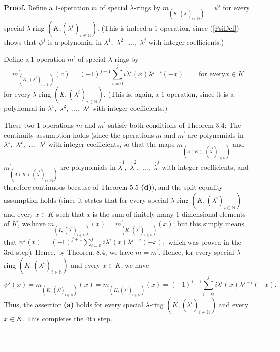 \documentclass[numbers=enddot,12pt,final,onecolumn,notitlepage]{scrartcl}%
\newenvironment{proof}[1][Proof]{\noindent\textbf{#1.} }{\ \rule{0.5em}{0.5em}}
\begin{document}
\begin{proof}
Define a $1$-operation $m$ of special $\lambda$-rings by $m_{\left(  K,\left(
\lambda^{i}\right)  _{i\in\mathbb{N}}\right)  }=\psi^{j}$ for every special
$\lambda$-ring $\left(  K,\left(  \lambda^{i}\right)  _{i\in\mathbb{N}%
}\right)  $. (This is indeed a $1$-operation, since (\ref{PsiDef}) shows that
$\psi^{j}$ is a polynomial in $\lambda^{1},$ $\lambda^{2},$ $...,$
$\lambda^{j}$ with integer coefficients.)

Define a $1$-operation $m^{\prime}$ of special $\lambda$-rings by%
\[
m_{\left(  K,\left(  \lambda^{i}\right)  _{i\in\mathbb{N}}\right)  }^{\prime
}\left(  x\right)  =\left(  -1\right)  ^{j+1}\sum_{i=0}^{j}i\lambda^{i}\left(
x\right)  \lambda^{j-i}\left(  -x\right)  \ \ \ \ \ \ \ \ \ \ \text{for every
}x\in K
\]
for every $\lambda$-ring $\left(  K,\left(  \lambda^{i}\right)  _{i\in
\mathbb{N}}\right)  $. (This is, again, a $1$-operation, since it is a
polynomial in $\lambda^{1},$ $\lambda^{2},$ $...,$ $\lambda^{j}$ with integer coefficients.)

These two $1$-operations $m$ and $m^{\prime}$ satisfy both conditions of
Theorem 8.4: The continuity assumption holds (since the operations $m$ and
$m^{\prime}$ are polynomials in $\lambda^{1},$ $\lambda^{2},$ $...,$
$\lambda^{j}$ with integer coefficients, so that the maps $m_{\left(
\Lambda\left(  K\right)  ,\left(  \widehat{\lambda}^{i}\right)  _{i\in
\mathbb{N}}\right)  }$ and $m_{\left(  \Lambda\left(  K\right)  ,\left(
\widehat{\lambda}^{i}\right)  _{i\in\mathbb{N}}\right)  }^{\prime}$ are
polynomials in $\widehat{\lambda}^{1},$ $\widehat{\lambda}^{2},$ $...,$
$\widehat{\lambda}^{j}$ with integer coefficients, and therefore continuous
because of Theorem 5.5 \textbf{(d)}), and the split equality assumption holds
(since it states that for every special $\lambda$-ring $\left(  K,\left(
\lambda^{i}\right)  _{i\in\mathbb{N}}\right)  $ and every $x\in K$ such that
$x$ is the sum of finitely many $1$-dimensional elements of $K$, we have
$m_{\left(  K,\left(  \lambda^{i}\right)  _{i\in\mathbb{N}}\right)  }\left(
x\right)  =m_{\left(  K,\left(  \lambda^{i}\right)  _{i\in\mathbb{N}}\right)
}^{\prime}\left(  x\right)  $; but this simply means that $\psi^{j}\left(
x\right)  =\left(  -1\right)  ^{j+1}\sum\limits_{i=0}^{j}i\lambda^{i}\left(
x\right)  \lambda^{j-i}\left(  -x\right)  ,$ which was proven in the 3rd
step). Hence, by Theorem 8.4, we have $m=m^{\prime}$. Hence, for every special
$\lambda$-ring $\left(  K,\left(  \lambda^{i}\right)  _{i\in\mathbb{N}%
}\right)  $ and every $x\in K$, we have%
\[
\psi^{j}\left(  x\right)  =m_{\left(  K,\left(  \lambda^{i}\right)
_{i\in\mathbb{N}}\right)  }\left(  x\right)  =m_{\left(  K,\left(  \lambda
^{i}\right)  _{i\in\mathbb{N}}\right)  }^{\prime}\left(  x\right)  =\left(
-1\right)  ^{j+1}\sum_{i=0}^{j}i\lambda^{i}\left(  x\right)  \lambda
^{j-i}\left(  -x\right)  .
\]
Thus, the assertion \textbf{(a)} holds for every special $\lambda$-ring
$\left(  K,\left(  \lambda^{i}\right)  _{i\in\mathbb{N}}\right)  $ and every
$x\in K$. This completes the 4th step.


\end{proof}
\end{document}
